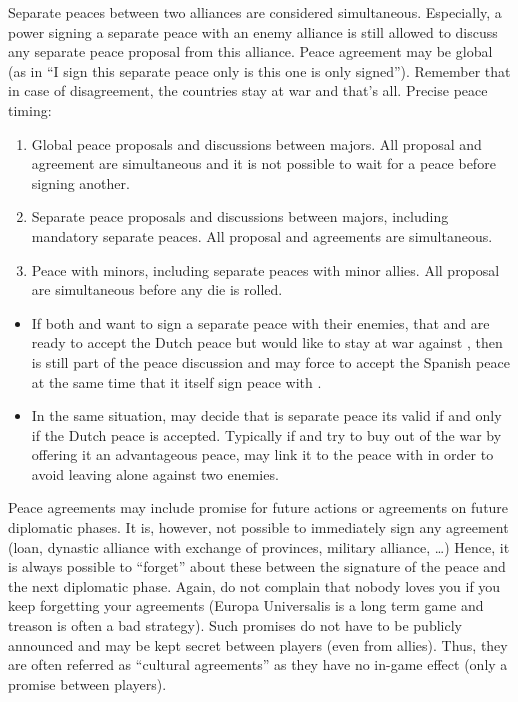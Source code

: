 Separate peaces between two alliances are considered simultaneous. Especially,
a power signing a separate peace with an enemy alliance is still allowed to
discuss any separate peace proposal from this alliance. Peace agreement may be
global (as in ``I sign this separate peace only is this one is only
signed''). Remember that in case of disagreement, the countries stay at war
and that's all.
\bparag Precise peace timing:
\begin{enumerate}
\item Global peace proposals and discussions between majors. All proposal and
  agreement are simultaneous and it is not possible to wait for a peace before
  signing another.
\item Separate peace proposals and discussions between majors, including
  mandatory separate peaces. All proposal and agreements are simultaneous.
\item Peace with minors, including separate peaces with minor allies. All
  proposal are simultaneous before any die is rolled.
\end{enumerate}

\begin{exemple}[Continued]
  \begin{itemize}
  \item If both \HOL and \HIS want to sign a separate peace with their
    enemies, that \FRA and \HIS are ready to accept the Dutch peace but \ANG
    would like to stay at war against \HIS, then \HOL is still part of the
    peace discussion and may force \ANG to accept the Spanish peace at the
    same time that it itself sign peace with \FRA.
  \item In the same situation, \HIS may decide that is separate peace its
    valid if and only if the Dutch peace is accepted. Typically if \ANG and
    \HOL try to buy \HIS out of the war by offering it an advantageous peace,
    \HIS may link it to the peace with \HOL in order to avoid leaving \FRA
    alone against two enemies.
  \end{itemize}
\end{exemple}

\bparag Peace agreements may include promise for future actions or agreements
on future diplomatic phases.
\bparag It is, however, not possible to immediately sign any agreement (loan,
dynastic alliance with exchange of provinces, military alliance, \ldots)
Hence, it is always possible to ``forget'' about these between the signature
of the peace and the next diplomatic phase. Again, do not complain that nobody
loves you if you keep forgetting your agreements (Europa Universalis is a long
term game and treason is often a bad strategy).
\bparag Such promises do not have to be publicly announced and may be kept
secret between players (even from allies). Thus, they are often referred as
``cultural agreements'' as they have no in-game effect (only a promise between
players). 

